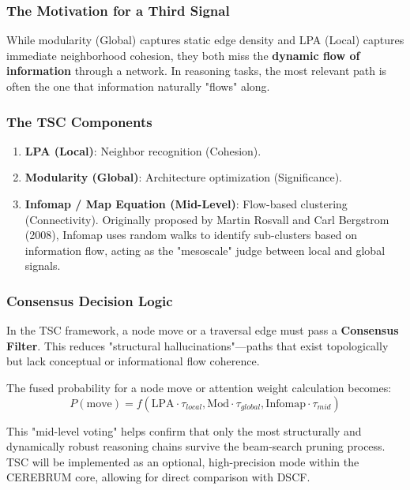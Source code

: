 \documentclass[10pt,journal,compsoc]{IEEEtran}
\begin{document}
\subsubsection{The Motivation for a Third Signal}

While modularity (Global) captures static edge density and LPA (Local) captures immediate neigh\-borhood cohesion, they both miss the \textbf{dynamic flow of information} through a network. In reasoning tasks, the most relevant path is often the one that information naturally "flows" along.

\subsubsection{The TSC Components}

\begin{enumerate}
\item \textbf{LPA (Local)}: Neighbor recognition (Cohesion).
\item \textbf{Modularity (Global)}: Archit\-ecture optim\-ization (Signif\-icance).
\item \textbf{Infomap / Map Equation (Mid-Level)}: Flow-based clustering (Connec\-tivity). Originally proposed by Martin Rosvall and Carl Bergstrom (2008), Infomap uses random walks to identify sub-clusters based on information flow, acting as the "mesoscale" judge between local and global signals.

\end{enumerate}
\subsubsection{Consensus Decision Logic}

In the TSC framework, a node move or a traversal edge must pass a \textbf{Consensus Filter}. This reduces "structural hallu\-cinations"—paths that exist topol\-ogically but lack conceptual or infor\-mational flow coherence.

The fused probability for a node move or attention weight calculation becomes:
\begin{equation}
P(\text{move}) = f(\text{LPA} \cdot \tau_{local}, \text{Mod} \cdot \tau_{global}, \text{Infomap} \cdot \tau_{mid})
\end{equation}

This "mid-level voting" helps confirm that only the most struc\-turally and dynamically robust reasoning chains survive the beam-search pruning process. TSC will be implemented as an optional, high-precision mode within the CEREBRUM core, allowing for direct comparison with DSCF.
\end{document}
